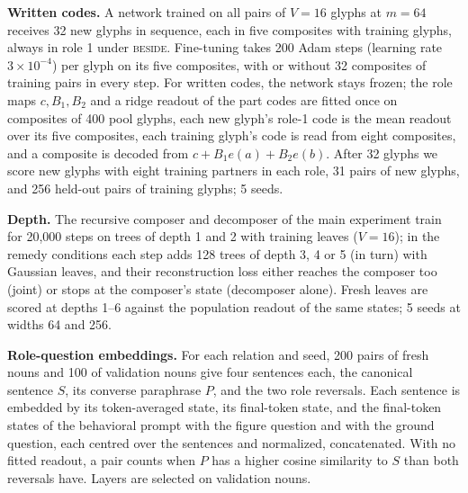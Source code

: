 \documentclass[10pt]{article}
\theoremstyle{plain}
\theoremstyle{remark}
\begin{document}
\textbf{Written codes.} A network trained on all pairs of $V = 16$ glyphs at $m = 64$ receives 32 new glyphs in sequence, each in five composites with training glyphs, always in role 1 under \textsc{beside}. Fine-tuning takes 200 Adam steps (learning rate $3 \times 10^{-4}$) per glyph on its five composites, with or without 32 composites of training pairs in every step. For written codes, the network stays frozen; the role maps $c, B_1, B_2$ and a ridge readout of the part codes are fitted once on composites of 400 pool glyphs, each new glyph's role-1 code is the mean readout over its five composites, each training glyph's code is read from eight composites, and a composite is decoded from $c + B_1 e(a) + B_2 e(b)$. After 32 glyphs we score new glyphs with eight training partners in each role, 31 pairs of new glyphs, and 256 held-out pairs of training glyphs; 5 seeds.

\textbf{Depth.} The recursive composer and decomposer of the main experiment train for 20{,}000 steps on trees of depth 1 and 2 with training leaves ($V = 16$); in the remedy conditions each step adds 128 trees of depth 3, 4 or 5 (in turn) with Gaussian leaves, and their reconstruction loss either reaches the composer too (joint) or stops at the composer's state (decomposer alone). Fresh leaves are scored at depths 1--6 against the population readout of the same states; 5 seeds at widths 64 and 256.

\textbf{Role-question embeddings.} For each relation and seed, 200 pairs of fresh nouns and 100 of validation nouns give four sentences each, the canonical sentence $S$, its converse paraphrase $P$, and the two role reversals. Each sentence is embedded by its token-averaged state, its final-token state, and the final-token states of the behavioral prompt with the figure question and with the ground question, each centred over the sentences and normalized, concatenated. With no fitted readout, a pair counts when $P$ has a higher cosine similarity to $S$ than both reversals have. Layers are selected on validation nouns.
\end{document}
